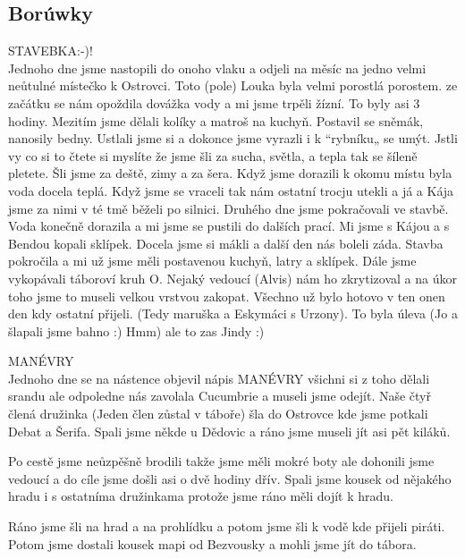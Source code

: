 \subsection*{Borúwky} %
\label{sub:borúwky}

\begin{multicols}{1}

STAVEBKA:-)!\\
Jednoho dne jsme nastopili do onoho vlaku a odjeli na měsíc na jedno velmi neůtulné místečko k Ostrovci. Toto (pole) Louka byla velmi porostlá porostem. ze začátku se nám opoždila dovážka vody a mi jsme trpěli žízní. To byly asi 3 hodiny. Mezitím jsme dělali kolíky a matroš na kuchyň. Postavil se sněmák, nanosily bedny. Ustlali jsme si a dokonce jsme vyrazli i k “rybníku„ se umýt. Jstli vy co si to čtete si myslíte že jsme šli za sucha, světla, a tepla tak se šíleně pletete. Šli jsme za deště, zimy a za šera. Když jsme dorazili k okomu místu byla voda docela teplá. Když jsme se vraceli tak nám ostatní trocju utekli a já a Kája jsme za nimi v té tmě běželi po silnici. Druhého dne jsme pokračovali ve stavbě. Voda konečně dorazila a mi jsme se pustili do dalších prací. Mi jsme s Kájou a s Bendou kopali sklípek. Docela jsme si mákli a další den nás boleli záda. Stavba pokročila a mi už jsme měli postavenou kuchyň, latry a sklípek. Dále jsme vykopávali táboroví kruh O. Nejaký vedoucí (Alvis) nám ho zkrytizoval a na úkor toho jsme to museli velkou vrstvou zakopat. Všechno už bylo hotovo v ten onen den kdy ostatní přijeli. (Tedy maruška a Eskymáci s Urzony). To byla úleva (Jo a šlapali jsme bahno :) Hmm) ale to zas Jindy :)

	

MANÉVRY\\
Jednoho dne se na nástence objevil nápis MANÉVRY všichni si z toho dělali srandu ale odpoledne nás zavolala Cucumbrie a museli jsme odejít. Naše čtyř člená družinka (Jeden člen zůstal v táboře) šla do Ostrovce kde jsme potkali Debat a Šerifa. Spali jsme někde u Dědovic a ráno jsme museli jít asi pět kiláků.


Po cestě jsme neůzpěšně brodili takže jsme měli mokré boty ale dohonili jsme vedoucí a do cíle jsme došli asi o dvě hodiny dřív. Spali jsme kousek od nějakého hradu i s ostatníma družinkama protože jsme ráno měli dojít k hradu. 


Ráno jsme šli na hrad a na prohlídku a potom jsme šli k vodě kde přijeli piráti. Potom jsme dostali kousek mapi od Bezvousky a mohli jsme jít do tábora.


\end{multicols}
